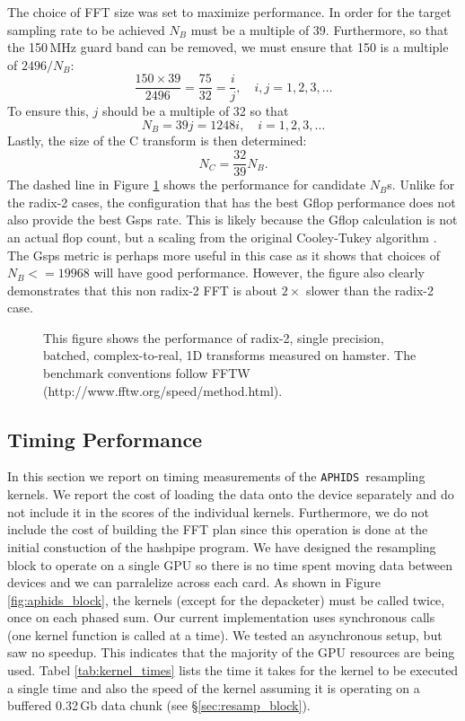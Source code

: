 \documentclass[11pt,preprint]{aastex}
\newcommand{\APHIDS}{\texttt{APHIDS}}
\begin{document}
The choice of FFT size was set to maximize performance.  In order for the target sampling rate to be achieved
$N_B$ must be a multiple of 39.  Furthermore, so that the 150\,MHz guard band can be removed, we must ensure that 
150 is a multiple of $2496/N_B$:
\begin{equation}
\frac{150\times39}{2496} = \frac{75}{32} = \frac{i}{j}, \quad i,j = 1, 2,3, \ldots
\end{equation}
To ensure this, $j$ should be a multiple of 32 so that 
\begin{equation}
N_B = 39j = 1248i, \quad i=1,2,3,\ldots
\end{equation}
Lastly, the size of the C transform is then determined:
\begin{equation}
N_C = \frac{32}{39} N_B.
\end{equation}
The dashed line in Figure \ref{fig:C2R_performance} shows the performance for candidate $N_B$s.  Unlike for 
the radix-2 cases, the configuration that has the best Gflop performance does not also provide the best Gsps
rate.  This is likely because the Gflop calculation is not an actual flop count, but a scaling from the 
original Cooley-Tukey algorithm \citep{cooley59}.  The Gsps metric is perhaps more useful in this case as it
shows that choices of $N_B <= 19968$ will have good performance.  However, the figure also clearly demonstrates
that this non radix-2 FFT is about $2\times$ slower than the radix-2 case.


\begin{figure}[H!]
\caption{This figure shows the performance of radix-2, single precision, batched, complex-to-real, 1D transforms 
measured on hamster. The benchmark conventions follow FFTW  (http://www.fftw.org/speed/method.html).}
\label{fig:C2R_performance}
\end{figure}

\subsection{Timing Performance}

In this section we report on timing measurements of the \APHIDS\, resampling kernels.  We report the cost of 
loading the data onto the device separately and do not include it in the scores of the individual kernels.  
Furthermore, we do not include the cost of building the FFT plan since this operation is done at the initial
constuction of the hashpipe program.
We have designed the resampling block to operate on a single GPU so there is no time spent moving data 
between devices and we can parralelize across each card.  As shown in Figure \ref{fig:aphids_block}, the
kernels (except for the depacketer) must be called
twice, once on each phased sum.  Our current implementation uses synchronous calls (one kernel function is 
called at a time).  We tested an asynchronous setup, but saw no speedup.  This indicates that the majority of 
the GPU resources are being used.  Tabel \ref{tab:kernel_times} lists the time it takes for the kernel to be 
executed a single time and also the speed of the kernel assuming it is operating on a buffered 0.32\,Gb data 
chunk (see \S\ref{sec:resamp_block}).
\end{document}
